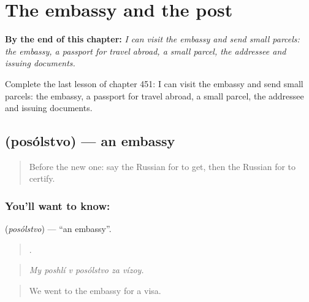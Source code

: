 
\chapter{The embassy and the post}
\label{ch:ru-the-embassy-and-the-post}

\begin{chapteropening}
\textbf{By the end of this chapter:} \emph{I can visit the embassy and send small parcels: the embassy, a passport for travel abroad, a small parcel, the addressee and issuing documents.}

Complete the last lesson of chapter 451: I can visit the embassy and send small parcels: the embassy, a passport for travel abroad, a small parcel, the addressee and issuing documents.
\end{chapteropening}

\section[\texorpdfstring{\ru{посольство} (posólstvo)}{посольство (posólstvo)}]{ (posólstvo) — an embassy}

\label{lesson:RU-C451-posolstvo}



\begin{quote}
Before the new one: say the Russian for to get, then the Russian for to certify.
\end{quote}

\subsection*{You'll want to know: }
\textbf{} (\emph{posólstvo}) — \textquotedblleft{}an embassy\textquotedblright{}.

\begin{quote}
     .
\end{quote}

\begin{quote}
\emph{My poshlí v posólstvo za vízoy.}
\end{quote}

\begin{quote}
We went to the embassy for a visa.
\end{quote}

